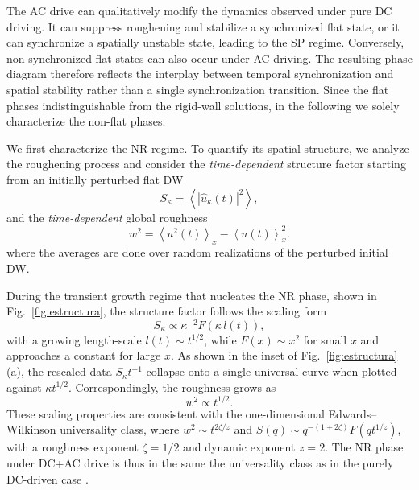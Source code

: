 \documentclass[prb,aps,twocolumn,superscriptaddress,floatfix]{revtex4-1}
\begin{document}
The AC drive can qualitatively modify the dynamics observed under pure DC driving. It can suppress roughening and stabilize a synchronized flat state, or it can synchronize a spatially unstable state, leading to the SP regime. Conversely, non-synchronized flat states can also occur under AC driving. The resulting phase diagram therefore reflects the interplay between temporal synchronization and spatial stability rather than a single synchronization transition.
Since the flat phases indistinguishable from the rigid-wall solutions, in the following we solely characterize the non-flat phases.


We first characterize the NR regime. To quantify its spatial structure, we analyze the roughening process and consider the \textit{time-dependent} structure factor starting from an initially perturbed flat DW
\begin{equation}
    S_\kappa = \left\langle\left|\hat u_\kappa(t)\right|^2\right\rangle ,
    \label{eq:factor_estructura}
\end{equation}
and the \textit{time-dependent} global roughness 
\begin{equation}
w^2 =
\left\langle u^2(t)\right\rangle_x
-\left\langle u(t)\right\rangle_x^2
.
\label{eq:roughness}
\end{equation} 
where the averages are done over random realizations of the perturbed initial DW. 


During the transient growth regime that nucleates the NR phase, 
shown in Fig.~\ref{fig:estructura},
the structure factor follows the scaling form
\begin{equation}
S_\kappa \propto \kappa^{-2}F(\kappa \, l(t)),
\end{equation}
with a growing length-scale $l(t)\sim t^{1/2}$, while $F(x)\sim x^2$ for small $x$ and approaches a constant for large $x$.
As shown in the inset of Fig.~\ref{fig:estructura}(a), the rescaled data $S_\kappa t^{-1}$ collapse onto a single universal curve when plotted against $\kappa t^{1/2}$.
Correspondingly, the roughness grows as
\begin{equation}
w^2 \propto t^{1/2}.
\end{equation}
These scaling properties are consistent with the one-dimensional Edwards--Wilkinson universality class, where $w^2 \sim t^{2\zeta/z}$ and $S(q)\sim q^{-(1+2\zeta)}F(q t^{1/z})$, with a roughness exponent $\zeta=1/2$ and dynamic exponent $z=2$. The NR phase under DC+AC drive is thus in the same the universality class as in the purely DC-driven case \cite{pusiol2026deterministic}.
\end{document}
